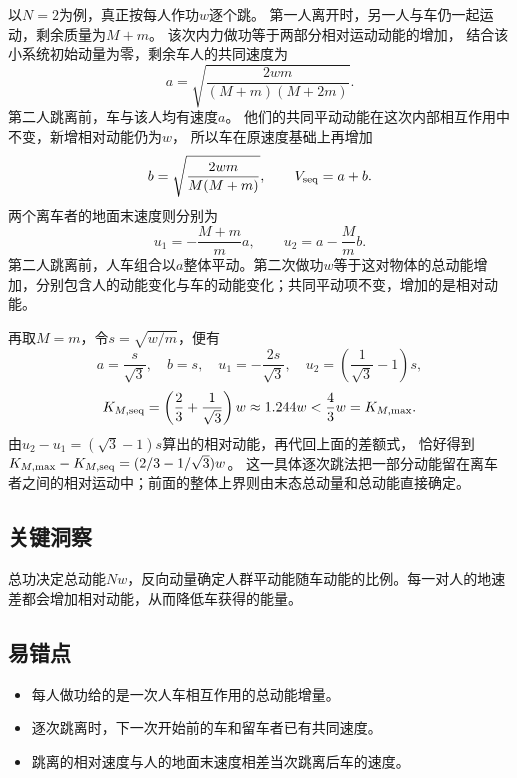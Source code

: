 \documentclass[UTF8,fontset=fandol,a4paper,11pt]{ctexart}
\begin{document}
以$N=2$为例，真正按每人作功$w$逐个跳。
第一人离开时，另一人与车仍一起运动，剩余质量为$M+m$。
该次内力做功等于两部分相对运动动能的增加，
结合该小系统初始动量为零，剩余车人的共同速度为
\[
a=\sqrt{\frac{2wm}{(M+m)(M+2m)}}.
\]
第二人跳离前，车与该人均有速度$a$。
他们的共同平动动能在这次内部相互作用中不变，新增相对动能仍为$w$，
所以车在原速度基础上再增加
\[
b=\sqrt{\frac{2wm}{M(M+m)}},\qquad V_{\rm seq}=a+b.
\]
两个离车者的地面末速度则分别为
\[
u_1=-\frac{M+m}{m}a,\qquad
u_2=a-\frac Mm b.
\]
第二人跳离前，人车组合以$a$整体平动。第二次做功$w$等于这对物体的总动能增加，分别包含人的动能变化与车的动能变化；共同平动项不变，增加的是相对动能。

再取$M=m$，令$s=\sqrt{w/m}$，便有
\[
a=\frac{s}{\sqrt3},\quad b=s,\quad
u_1=-\frac{2s}{\sqrt3},\quad
u_2=\left(\frac1{\sqrt3}-1\right)s,
\]
\[
K_{M,\rm seq}=\left(\frac23+\frac1{\sqrt3}\right)w
\approx1.244w
<\frac43w=K_{M,\max}.
\]
由$u_2-u_1=(\sqrt3-1)s$算出的相对动能，再代回上面的差额式，
恰好得到$K_{M,\max}-K_{M,\rm seq}=(2/3-1/\sqrt3)w$。
这一具体逐次跳法把一部分动能留在离车者之间的相对运动中；前面的整体上界则由末态总动量和总动能直接确定。




\subsection*{关键洞察}

总功决定总动能$Nw$，反向动量确定人群平动能随车动能的比例。每一对人的地速差都会增加相对动能，从而降低车获得的能量。



\subsection*{易错点}

\begin{itemize}
\item 每人做功给的是一次人车相互作用的总动能增量。
\item 逐次跳离时，下一次开始前的车和留车者已有共同速度。
\item 跳离的相对速度与人的地面末速度相差当次跳离后车的速度。
\end{itemize}


\end{document}
